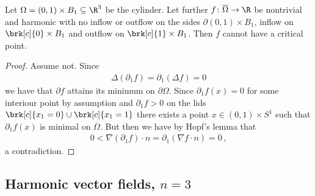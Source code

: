 \begin{proposition}
  Let $\Omega=(0,1)\times B_1\subseteq\R^3$ be the cylinder. Let further $f\colon\overline{\Omega}\to\R$ be nontrivial and 
  harmonic with no inflow or outflow on the sides 
  $\partial (0,1)\times B_1$, inflow on $\brk[c]{0}\times B_1$ and outflow on $\brk[c]{1}\times B_1$. 
  Then $f$ cannot have a critical point.
\end{proposition}
\begin{proof}
  Assume not. Since
  \begin{align*}
    \Delta(\partial_1f)=\partial_1(\Delta f)=0
  \end{align*}
  we have that $\partial f$ attains its minimum on $\partial\Omega$. Since $\partial_1 f(x)=0$ for some interiour point 
  by assumption and $\partial_1 f>0$ on the lids $\brk[c]{x_1=0}\cup\brk[c]{x_1=1}$ there exists a point
  $x\in(0,1)\times S^1$ such that $\partial_1f(x)$ is minimal on $\overline{\Omega}$. But then we have by Hopf's lemma
  that
  \begin{align*}
    0<\nabla (\partial_1f)\cdot n=\partial_1(\nabla f\cdot n)=0\,,
  \end{align*}
  a contradiction.
\end{proof}

\newpage

\subsection*{Harmonic vector fields, $n=3$}


